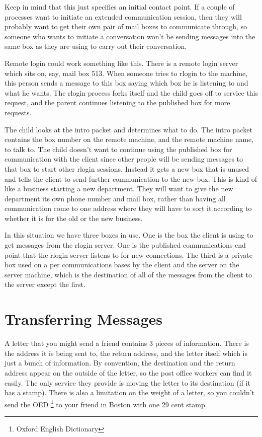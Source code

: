 Keep in mind that this just specifies an initial contact point.  If a couple
of processes want to initiate an extended communication session, then they
will probably want to get their own pair of mail boxes to communicate through,
so someone who wants to initiate a conversation won't be sending messages into
the same box as they are using to carry out their conversation.

Remote login could work something like this.  There is a remote login server
which sits on, say, mail box 513.  When someone tries to rlogin to the
machine, this person sends a message to this box saying which box he is
listening to and what he wants.  The rlogin process forks itself and the
child goes off to service this request, and the parent continues listening
to the published box for more requests.

The child looks at the intro packet and determines what to do.  The intro
packet contains the box number on the remote machine, and the remote machine
name, to talk to.
The child doesn't want to continue using the published box for communication
with the client since other people will be sending messages to that box to
start other rlogin sessions.  Instead it gets a new box that is unused and
tells the client to send further communication to the new box.  This
is kind of like a business starting a new department.  They will want to
give the new department its own phone number and mail box, rather than
having all communication come to one address where they will have to sort
it according to whether it is for the old or the new business.

In this situation we have three boxes in use.  One is the box the client is
using to get messages from the rlogin server.  One is the published 
communications end point that the rlogin server listens to for new
connections.  The third is a private box used on a per communications
bases by the client and the server on the server machine, which is the
destination of all of the messages from the client to the server except
the first.

\section{Transferring Messages}

A letter that you might send a friend contains 3 pieces of information.  There
is the address it is being sent to, the return address, and the letter itself
which is just a bunch of information.  By convention, the destination and
the return address appear on the outside of the letter, so the post office
workers can find it easily.  The only service they provide is moving the
letter to its destination (if it has a stamp).  There is also a limitation
on the weight of a letter, so you couldn't send the OED 
\footnote{Oxford English Dictionary} to your friend in
Boston with one 29 cent stamp.


